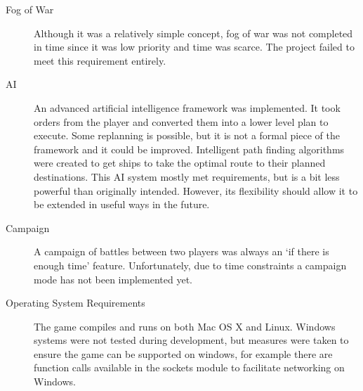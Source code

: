 \begin{description}
  \item[Fog of War] Although it was a relatively simple concept, fog of war was not completed in time since it was low priority and time was scarce. The project failed to meet this requirement entirely.

  \item[AI] An advanced artificial intelligence framework was implemented. It took orders from the player and converted them into a lower level plan to execute. Some replanning is possible, but it is not a formal piece of the framework and it could be improved. Intelligent path finding algorithms were created to get ships to take the optimal route to their planned destinations. This AI system mostly met requirements, but is a bit less powerful than originally intended. However, its flexibility should allow it to be extended in useful ways in the future.

  \item[Campaign] A campaign of battles between two players was always an `if there is enough time' feature. Unfortunately, due to time constraints a campaign mode has not been implemented yet.

  \item[Operating System Requirements] The game compiles and runs on both Mac OS X and Linux. Windows systems were not tested during development, but measures were taken to ensure the game can be supported on windows, for example there are function calls available in the sockets module to facilitate networking on Windows.

\end{description}

